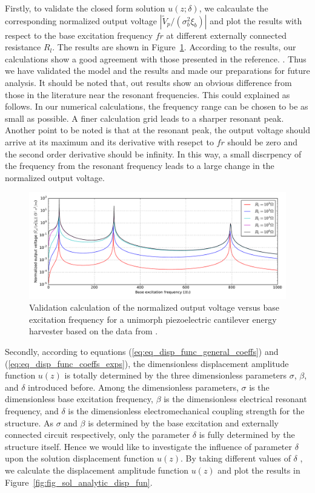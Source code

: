 \documentclass{article}
\begin{document}
Firstly, to validate the closed form solution $u(z;\delta)$, we calcaulate the corresponding normalized output voltage $| \tilde{V}_p/(\sigma_b^2 \xi_b) |$ and plot the results with respect to the base excitation frequency $fr$ at different externally connected resistance $R_l$. The results are shown in Figure~\ref{fig:fig_sol_analytic_perf_vs_fr}. According to the results, our calculations show a good agreement with those presented in the reference. \cite{erturk2008distributed}. Thus we have validated the model and the results and made our preparations for future analysis. It should be noted that, out results show an obvious difference from those in the literature \cite{erturk2008distributed} near the resonant frequencies. This could explained as follows. In our numerical calculations, the frequency range can be chosen to be as small as possible. A finer calculation grid leads to a sharper resonant peak. Another point to be noted is that at the resonant peak, the output voltage should arrive at its maximum and its derivative with resepct to $fr$ should be zero and the second order derivative should be infinity. In this way, a small discrpency of the frequency from the resonant frequency leads to a large change in the normalized output voltage. 

\begin{figure}[!htbp]
    \centering
    \includegraphics[width=\textwidth]{./img_eig_asy/fig_sol_analytic_perf_vs_fr}
    \caption{Validation calculation of the normalized output voltage versus base excitation frequency for a unimorph piezoelectric cantilever energy harvester based on the data from \cite{erturk2008distributed}.}
    \label{fig:fig_sol_analytic_perf_vs_fr}
\end{figure}

Secondly, according to equations (\ref{eq:eq_disp_func_general_coeffs}) and (\ref{eq:eq_disp_func_coeffs_exps}), the dimensionless displacement amplitude function $u(z)$ is totally determined by the three dimensionless parameters $\sigma$, $\beta$, and $\delta$ introduced before. Among the dimensionless parameters, $\sigma$ is the dimensionless base excitation frequency, $\beta$ is the dimensionless electrical resonant frequency, and $\delta$ is the dimensionless electromechanical coupling strength for the structure. As $\sigma$ and $\beta$ is determined by the base excitation and externally connected circuit respectively, only the parameter $\delta$ is fully determined by the structure itself. Hence we would like to investigate the influence of parameter $\delta$ upon the solution displacement function $u(z)$. By taking different values of $\delta$ , we calculate the displacement amplitude function $u(z)$ and plot the results in Figure~\ref{fig:fig_sol_analytic_disp_fun}.
\end{document}
